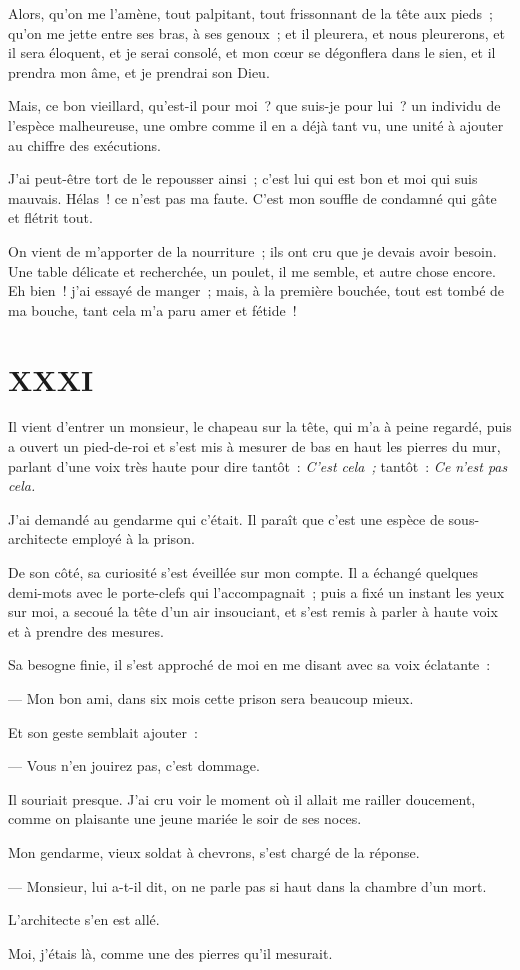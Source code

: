 \documentclass[french,twoside]{book} %
\begin{document}
Alors, qu’on me l’amène, tout palpitant, tout frissonnant de la tête aux pieds ; qu’on me jette entre ses bras, à ses genoux ; et il pleurera, et nous pleurerons, et il sera éloquent, et je serai consolé, et mon cœur se dégonflera dans le sien, et il prendra mon âme, et je prendrai son Dieu.\par
Mais, ce bon vieillard, qu’est-il pour moi ? que suis-je pour lui ? un individu de l’espèce malheureuse, une ombre comme il en a déjà tant vu, une unité à ajouter au chiffre des exécutions.\par
J’ai peut-être tort de le repousser ainsi ; c’est lui qui est bon et moi qui suis mauvais. Hélas ! ce n’est pas ma faute. C’est mon souffle de condamné qui gâte et flétrit tout.\par
On vient de m’apporter de la nourriture ; ils ont cru que je devais avoir besoin. Une table délicate et recherchée, un poulet, il me semble, et autre chose encore. Eh bien ! j’ai essayé de manger ; mais, à la première bouchée, tout est tombé de ma bouche, tant cela m’a paru amer et fétide !
 \section[{XXXI}]{XXXI}
\label{ch31}\renewcommand{\leftmark}{XXXI}

\noindent Il vient d’entrer un monsieur, le chapeau sur la tête, qui m’a à peine regardé, puis a ouvert un pied-de-roi et s’est mis à mesurer de bas en haut les pierres du mur, parlant d’une voix très haute pour dire tantôt : \emph{C’est cela ;} tantôt : \emph{Ce n’est pas cela.}\par
J’ai demandé au gendarme qui c’était. Il paraît que c’est une espèce de sous-architecte employé à la prison.\par
De son côté, sa curiosité s’est éveillée sur mon compte. Il a échangé quelques demi-mots avec le porte-clefs qui l’accompagnait ; puis a fixé un instant les yeux sur moi, a secoué la tête d’un air insouciant, et s’est remis à parler à haute voix et à prendre des mesures.\par
Sa besogne finie, il s’est approché de moi en me disant avec sa voix éclatante :\par
— Mon bon ami, dans six mois cette prison sera beaucoup mieux.\par
Et son geste semblait ajouter :\par
 — Vous n’en jouirez pas, c’est dommage.\par
Il souriait presque. J’ai cru voir le moment où il allait me railler doucement, comme on plaisante une jeune mariée le soir de ses noces.\par
Mon gendarme, vieux soldat à chevrons, s’est chargé de la réponse.\par
— Monsieur, lui a-t-il dit, on ne parle pas si haut dans la chambre d’un mort.\par
L’architecte s’en est allé.\par
Moi, j’étais là, comme une des pierres qu’il mesurait.
\end{document}
